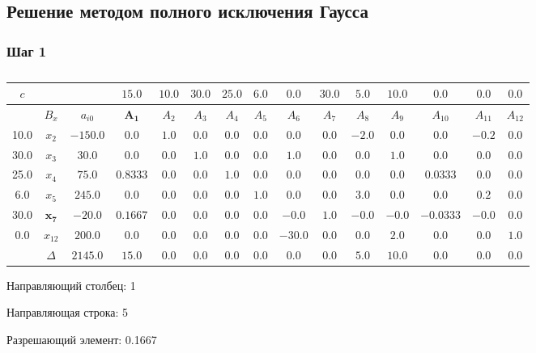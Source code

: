 \normalsize

\subsection{Решение методом полного исключения Гаусса}

\begin{landscape}

\subsubsection{Шаг 1}

\begin{table}[H]
	\centering
	\normalsize
	\caption{}
	\label{tbl:1}
	\begin{tabular}{|c|c|c|c|c|c|c|c|c|c|c|c|c|c|c|}
		\hline
		$c$&&&$15.0$&$10.0$&$30.0$&$25.0$&$6.0$&$0.0$&$30.0$&$5.0$&$10.0$&$0.0$&$0.0$&$0.0$\\ \hline
		&$B_x$&$a_{i0}$&$\mathbf{A_{1}}$&$A_{2}$&$A_{3}$&$A_{4}$&$A_{5}$&$A_{6}$&$A_{7}$&$A_{8}$&$A_{9}$&$A_{10}$&$A_{11}$&$A_{12}$\\ \hline
		10.0&$x_{2}$&$-150.0$&$0.0$&$1.0$&$0.0$&$0.0$&$0.0$&$0.0$&$0.0$&$-2.0$&$0.0$&$0.0$&$-0.2$&$0.0$\\ \hline
		30.0&$x_{3}$&$30.0$&$0.0$&$0.0$&$1.0$&$0.0$&$0.0$&$1.0$&$0.0$&$0.0$&$1.0$&$0.0$&$0.0$&$0.0$\\ \hline
		25.0&$x_{4}$&$75.0$&$0.8333$&$0.0$&$0.0$&$1.0$&$0.0$&$0.0$&$0.0$&$0.0$&$0.0$&$0.0333$&$0.0$&$0.0$\\ \hline
		6.0&$x_{5}$&$245.0$&$0.0$&$0.0$&$0.0$&$0.0$&$1.0$&$0.0$&$0.0$&$3.0$&$0.0$&$0.0$&$0.2$&$0.0$\\ \hline
		$30.0$&$\mathbf{x_{7}}$&$-20.0$&$\mathbf{0.1667}$&$0.0$&$0.0$&$0.0$&$0.0$&$-0.0$&$1.0$&$-0.0$&$-0.0$&$-0.0333$&$-0.0$&$0.0$\\ \hline
		0.0&$x_{12}$&$200.0$&$0.0$&$0.0$&$0.0$&$0.0$&$0.0$&$-30.0$&$0.0$&$0.0$&$2.0$&$0.0$&$0.0$&$1.0$\\ \hline
		&$\Delta$&$2145.0$&$15.0$&$0.0$&$0.0$&$0.0$&$0.0$&$0.0$&$0.0$&$5.0$&$10.0$&$0.0$&$0.0$&$0.0$\\ \hline

\end{tabular}

\end{table}

Направляющий столбец: 1

Направляющая строка: 5

Разрешающий элемент: 0.1667

\end{landscape}

